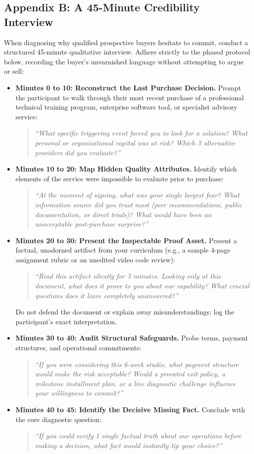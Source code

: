 \subsection*{Appendix B: A 45-Minute Credibility Interview}

When diagnosing why qualified prospective buyers hesitate to commit, conduct a structured 45-minute qualitative interview. Adhere strictly to the phased protocol below, recording the buyer's unvarnished language without attempting to argue or sell:

\begin{itemize}
\item \textbf{Minutes 0 to 10: Reconstruct the Last Purchase Decision.} Prompt the participant to walk through their most recent purchase of a professional technical training program, enterprise software tool, or specialist advisory service:
\begin{quote}
\textit{``What specific triggering event forced you to look for a solution? What personal or organizational capital was at risk? Which 3 alternative providers did you evaluate?''}
\end{quote}
\item \textbf{Minutes 10 to 20: Map Hidden Quality Attributes.} Identify which elements of the service were impossible to evaluate prior to purchase:
\begin{quote}
\textit{``At the moment of signing, what was your single largest fear? What information source did you trust most (peer recommendations, public documentation, or direct trials)? What would have been an unacceptable post-purchase surprise?''}
\end{quote}
\item \textbf{Minutes 20 to 30: Present the Inspectable Proof Asset.} Present a factual, unadorned artifact from your curriculum (e.g., a sample 4-page assignment rubric or an unedited video code review):
\begin{quote}
\textit{``Read this artifact silently for 5 minutes. Looking only at this document, what does it prove to you about our capability? What crucial questions does it leave completely unanswered?''}
\end{quote}
Do not defend the document or explain away misunderstandings; log the participant's exact interpretation.
\item \textbf{Minutes 30 to 40: Audit Structural Safeguards.} Probe terms, payment structures, and operational commitments:
\begin{quote}
\textit{``If you were considering this 6-week studio, what payment structure would make the risk acceptable? Would a prorated exit policy, a milestone installment plan, or a live diagnostic challenge influence your willingness to commit?''}
\end{quote}
\item \textbf{Minutes 40 to 45: Identify the Decisive Missing Fact.} Conclude with the core diagnostic question:
\begin{quote}
\textit{``If you could verify 1 single factual truth about our operations before making a decision, what fact would instantly tip your choice?''}
\end{quote}
\end{itemize}

